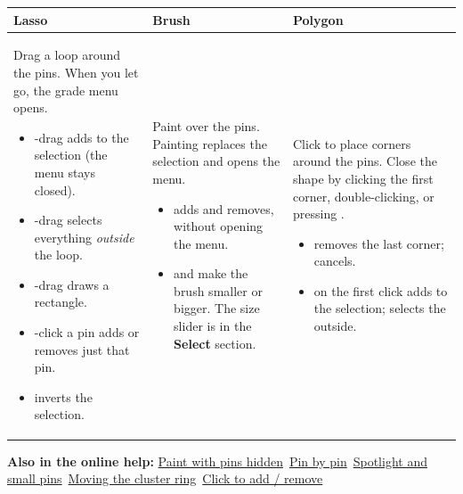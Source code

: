 {
\noindent\begin{tabularx}{\linewidth}{@{}Y@{\hspace{1.2em}}Y@{\hspace{1.2em}}Y@{}}
\toprule
\textbf{Lasso} & \textbf{Brush} & \textbf{Polygon} \\
\midrule
Drag a loop around the pins. When you let go, the grade menu opens.
\begin{itemize}
\item \keycap{\cmdsym{}}-drag adds to the selection (the menu stays closed).
\item \keycap{\shiftsym{}}-drag selects everything \emph{outside} the loop.
\item \keycap{\optsym{}}-drag draws a rectangle.
\item \keycap{\cmdsym{}}-click a pin adds or removes just that pin.
\item {} inverts the selection.
\end{itemize}
&
Paint over the pins. Painting replaces the selection and opens the menu.
\begin{itemize}
\item \keycap{\shiftsym{}} adds and \keycap{\optsym{}} removes, without opening the menu.
\item \keycap{-} and \keycap{=} make the brush smaller or bigger. The size slider is in the \textbf{Select} section.
\end{itemize}
&
Click to place corners around the pins. Close the shape by clicking the first corner, double-clicking, or pressing \keycap{\returnsym{}}.
\begin{itemize}
\item \keycap{\deletesym{}} removes the last corner;  cancels.
\item \keycap{\cmdsym{}} on the first click adds to the selection; \keycap{\shiftsym{}} selects the outside.
\end{itemize}
\\
\bottomrule
\end{tabularx}}\par\medskip

{\small\textbf{Also in the online help:} \href{https://github.com/agadin/micro-speed-grader/blob/main/docs/help/selecting.md\#paint-with-pins-hidden}{Paint with pins hidden}\,\onlinemark{} \textperiodcentered{} \href{https://github.com/agadin/micro-speed-grader/blob/main/docs/help/selecting.md\#pin-by-pin}{Pin by pin}\,\onlinemark{} \textperiodcentered{} \href{https://github.com/agadin/micro-speed-grader/blob/main/docs/help/selecting.md\#spotlight-and-small-pins}{Spotlight and small pins}\,\onlinemark{} \textperiodcentered{} \href{https://github.com/agadin/micro-speed-grader/blob/main/docs/help/selecting.md\#moving-the-cluster-ring}{Moving the cluster ring}\,\onlinemark{} \textperiodcentered{} \href{https://github.com/agadin/micro-speed-grader/blob/main/docs/help/selecting.md\#click-to-add--remove}{Click to add / remove}\,\onlinemark{}}
\vspace{-10pt}
